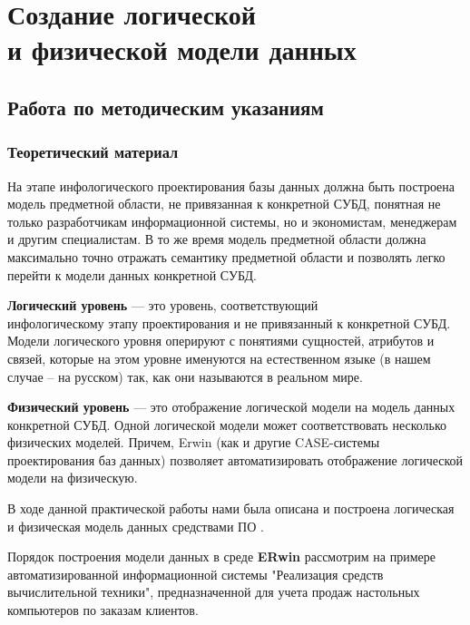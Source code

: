 \chapter{Создание логической\\и физической модели данных}
\label{cha:dmd}

\section{Работа по методическим указаниям}
\subsection*{Теоретический материал}
На этапе {инфологического} проектирования базы данных должна быть построена
модель предметной области, не привязанная к конкретной СУБД, понятная не только
разработчикам информационной системы, но и экономистам, менеджерам и другим
специалистам. В то же время модель предметной области должна максимально точно
отражать семантику предметной области и позволять легко перейти к модели данных
конкретной СУБД.

\textbf{Логический уровень} --- это уровень, соответствующий \\инфологическому этапу проектирования
и не привязанный к конкретной СУБД. Модели логического уровня оперируют с
понятиями сущностей, атрибутов и связей, которые на этом уровне именуются на
естественном языке (в нашем случае – на русском) так, как они называются в
реальном мире.

\textbf{Физический уровень} --- это отображение логической модели на модель данных
конкретной СУБД. Одной логической модели может соответствовать несколько
физических моделей. Причем, Erwin (как и другие CASE-системы проектирования баз
данных) позволяет автоматизировать отображение логической модели на физическую.


В ходе данной практической работы нами была описана и построена логическая и физическая модель данных средствами ПО \erdatamodaler.

Порядок построения модели данных в среде \textbf{ERwin} рассмотрим на примере
автоматизированной информационной системы "Реализация средств вычислительной
техники", предназначенной для учета продаж настольных компьютеров по заказам
клиентов.

